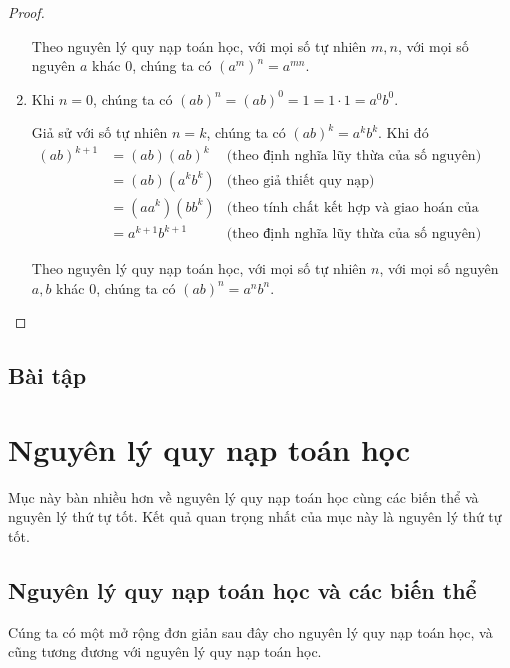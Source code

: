 \begin{proof}
\begin{enumerate}[topsep=0pt,itemsep=0pt,label={(\roman*)}]
              Theo nguyên lý quy nạp toán học, với mọi số tự nhiên $m, n$, với mọi số nguyên $a$ khác $0$, chúng ta có ${(a^{m})}^{n} = a^{mn}$.
        \item Khi $n = 0$, chúng ta có ${(ab)}^{n} = {(ab)}^{0} = 1 = 1\cdot 1 = a^{0}b^{0}$.

              Giả sử với số tự nhiên $n = k$, chúng ta có ${(ab)}^{k} = a^{k}b^{k}$. Khi đó
              \begin{align*}
                  {(ab)}^{k+1} & = (ab){(ab)}^{k}   & \text{(theo định nghĩa lũy thừa của số nguyên)}                      \\
                               & = (ab)(a^{k}b^{k}) & \text{(theo giả thiết quy nạp)}                                      \\
                               & = (aa^{k})(bb^{k}) & \text{(theo tính chất kết hợp và giao hoán của phép nhân số nguyên)} \\
                               & = a^{k+1}b^{k+1}   & \text{(theo định nghĩa lũy thừa của số nguyên)}
              \end{align*}

              Theo nguyên lý quy nạp toán học, với mọi số tự nhiên $n$, với mọi số nguyên $a, b$ khác $0$, chúng ta có ${(ab)}^{n} = a^{n}b^{n}$.
    \end{enumerate}
\end{proof}

\subsection{Bài tập}

\section{Nguyên lý quy nạp toán học}\label{section:principle-of-mathematical-induction}

Mục này bàn nhiều hơn về nguyên lý quy nạp toán học cùng các biến thể và nguyên lý thứ tự tốt. Kết quả quan trọng nhất của mục này là nguyên lý thứ tự tốt.

\subsection{Nguyên lý quy nạp toán học và các biến thể}

Cúng ta có một mở rộng đơn giản sau đây cho nguyên lý quy nạp toán học, và cũng tương đương với nguyên lý quy nạp toán học.

